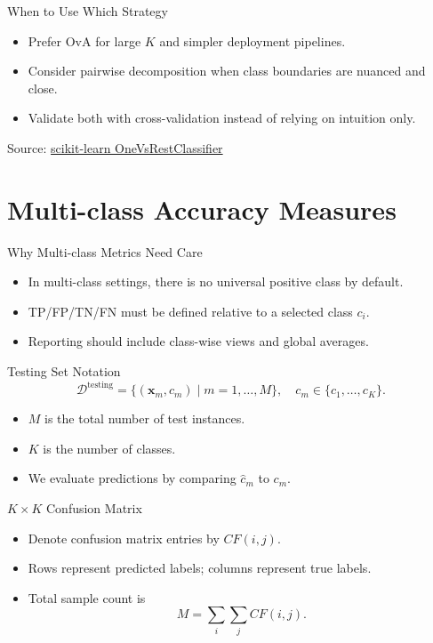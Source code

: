 \documentclass[10pt]{beamer}
\begin{document}
\begin{frame}{When to Use Which Strategy}
  \justifying
  \begin{itemize}
    \item Prefer OvA for large $K$ and simpler deployment pipelines.
    \item Consider pairwise decomposition when class boundaries are nuanced and close.
    \item Validate both with cross-validation instead of relying on intuition only.
  \end{itemize}
  \vspace{0.3em}
  {\footnotesize Source: \href{https://scikit-learn.org/stable/modules/generated/sklearn.multiclass.OneVsRestClassifier.html}{scikit-learn OneVsRestClassifier}}
\end{frame}

\section{Multi-class Accuracy Measures}

\begin{frame}{Why Multi-class Metrics Need Care}
  \justifying
  \begin{itemize}
    \item In multi-class settings, there is no universal positive class by default.
    \item TP/FP/TN/FN must be defined relative to a selected class $c_i$.
    \item Reporting should include class-wise views and global averages.
  \end{itemize}
\end{frame}

\begin{frame}{Testing Set Notation}
  \justifying
  \[
    \mathcal{D}^{\text{testing}} = \{(\bm{x}_m,c_m)\mid m=1,\ldots,M\},
    \quad c_m\in\{c_1,\ldots,c_K\}.
  \]
  \begin{itemize}
    \item $M$ is the total number of test instances.
    \item $K$ is the number of classes.
    \item We evaluate predictions by comparing $\hat{c}_m$ to $c_m$.
  \end{itemize}
\end{frame}

\begin{frame}{$K\times K$ Confusion Matrix}
  \justifying
  \begin{itemize}
    \item Denote confusion matrix entries by $CF(i,j)$.
    \item Rows represent predicted labels; columns represent true labels.
    \item Total sample count is
    \[
      M=\sum_i\sum_j CF(i,j).
    \]
  \end{itemize}
\end{frame}
\end{document}
